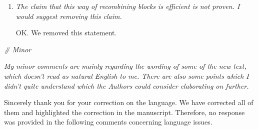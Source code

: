 \documentclass[a4paper,11pt,twoside]{report}
\begin{document}
\begin{enumerate}

    \item \textit{The claim that this way of recombining blocks is efficient is not proven. I would suggest removing this claim.}

    \hspace{1em} {\color{blue} OK. We removed this statement.}

\end{enumerate}


\noindent \textit{\# Minor}

\vspace{1em}

\textit{My minor comments are mainly regarding the wording of some of the new text, which doesn't read as natural English to me. There are also some points which I didn't quite understand which the Authors could consider elaborating on further.}

{\color{blue} Sincerely thank you for your correction on the language.
We have corrected all of them and
highlighted the correction in the manuscript.
Therefore, no response was provided in the following comments
concerning language issues.}
\end{document}
